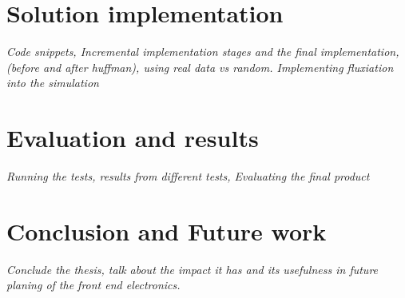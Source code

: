 \documentclass[a4paper]{report}
\begin{document}
\chapter{Solution implementation}
\textit{Code snippets, Incremental implementation stages and the final implementation, (before and after huffman), using real data vs random. Implementing fluxiation into the simulation}
\section{}


\chapter{Evaluation and results}
\textit{Running the tests, results from different tests, Evaluating the final product}

\chapter{Conclusion and Future work}
\textit{Conclude the thesis, talk about the impact it has and its usefulness in future planing of the front end electronics.}

{}

\end{document}
